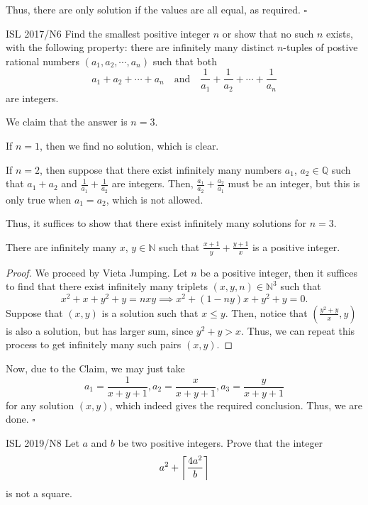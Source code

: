 \documentclass{article}
\begin{document}
Thus, there are only solution if the values are all equal, as required. $\square$

\begin{problem}[4.9.18]{ISL 2017/N6}
Find the smallest positive integer $n$ or show that no such $n$ exists, with the following property: there are infinitely many distinct $n$-tuples of postive rational numbers $(a_1, a_2, \cdots, a_n)$ such that both \[a_1+a_2+\cdots+a_n \quad \text{and} \quad \dfrac{1}{a_1}+\dfrac{1}{a_2}+\cdots+\dfrac{1}{a_n}\] are integers.
\end{problem}

We claim that the answer is $n = \boxed{3}$.

If $n = 1$, then we find no solution, which is clear.

If $n = 2$, then suppose that there exist infinitely many numbers $a_1$, $a_2 \in \mathbb{Q}$ such that $a_1+a_2$ and $\tfrac{1}{a_1}+\tfrac{1}{a_2}$ are integers. Then, $\tfrac{a_1}{a_2}+\tfrac{a_2}{a_1}$ must be an integer, but this is only true when $a_1 = a_2$, which is not allowed.

Thus, it suffices to show that there exist infinitely many solutions for $n = 3$.

\begin{claim*}
There are infinitely many $x$, $y \in \mathbb{N}$ such that $\tfrac{x+1}{y}+\tfrac{y+1}{x}$ is a positive integer.
\end{claim*}
\begin{proof}
We proceed by Vieta Jumping. Let $n$ be a positive integer, then it suffices to find that there exist infinitely many triplets $(x, y, n) \in \mathbb{N}^3$ such that \[x^2+x+y^2+y = nxy \implies x^2+(1-ny)x+y^2+y = 0.\] Suppose that $(x, y)$ is a solution such that $x \le y$. Then, notice that $\left(\tfrac{y^2+y}{x}, y\right)$ is also a solution, but has larger sum, since $y^2+y > x$. Thus, we can repeat this process to get infinitely many such pairs $(x, y)$.
\end{proof}

Now, due to the Claim, we may just take \[a_1 = \dfrac{1}{x+y+1}, a_2 = \dfrac{x}{x+y+1}, a_3 = \dfrac{y}{x+y+1}\] for any solution $(x, y)$, which indeed gives the required conclusion. Thus, we are done. $\square$

\begin{problem}[4.9.19]{ISL 2019/N8}
Let $a$ and $b$ be two positive integers. Prove that the integer \[a^2+\left\lceil \dfrac{4a^2}{b} \right\rceil\] is not a square.
\end{problem}
\end{document}
